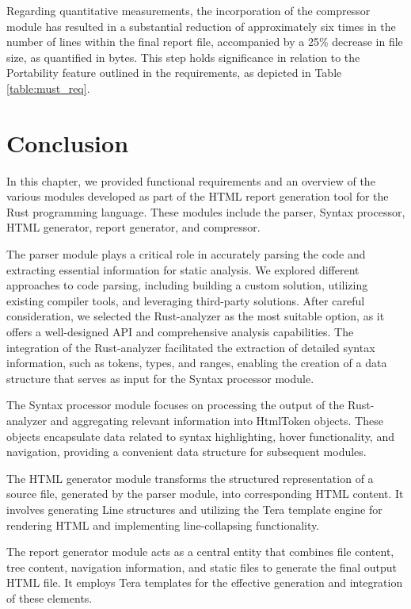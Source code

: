 Regarding quantitative measurements, the incorporation of the compressor module has resulted in a substantial reduction of approximately six times in the number of lines within the final report file, accompanied by a 25\% decrease in file size, as quantified in bytes. This step holds significance in relation to the Portability feature outlined in the requirements, as depicted in Table \ref{table:must_req}.

\section{Conclusion}
In this chapter, we provided functional requirements and an overview of the various modules developed as part of the HTML report generation tool for the Rust programming language. These modules include the parser, Syntax processor, HTML generator, report generator, and compressor.

The parser module plays a critical role in accurately parsing the code and extracting essential information for static analysis. We explored different approaches to code parsing, including building a custom solution, utilizing existing compiler tools, and leveraging third-party solutions. After careful consideration, we selected the Rust-analyzer as the most suitable option, as it offers a well-designed API and comprehensive analysis capabilities. The integration of the Rust-analyzer facilitated the extraction of detailed syntax information, such as tokens, types, and ranges, enabling the creation of a data structure that serves as input for the Syntax processor module.

The Syntax processor module focuses on processing the output of the Rust-analyzer and aggregating relevant information into HtmlToken objects. These objects encapsulate data related to syntax highlighting, hover functionality, and navigation, providing a convenient data structure for subsequent modules.

The HTML generator module transforms the structured representation of a source file, generated by the parser module, into corresponding HTML content. It involves generating Line structures and utilizing the Tera template engine for rendering HTML and implementing line-collapsing functionality.

The report generator module acts as a central entity that combines file content, tree content, navigation information, and static files to generate the final output HTML file. It employs Tera templates for the effective generation and integration of these elements.

